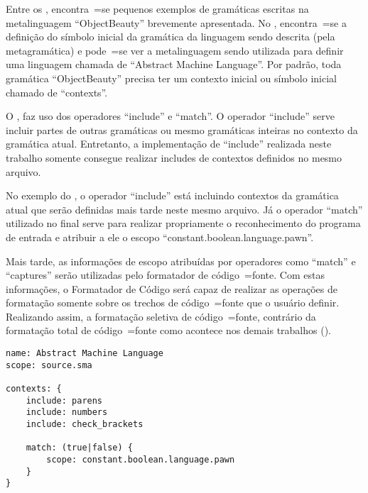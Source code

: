 Entre os ,
encontra~=se pequenos exemplos de gramáticas escritas na metalinguagem ``ObjectBeauty'' brevemente apresentada.
No ,
encontra~=se a definição do símbolo inicial da gramática da linguagem sendo descrita (pela metagramática) e
pode~=se ver a metalinguagem sendo utilizada para definir uma linguagem chamada de ``Abstract Machine Language''.
Por padrão,
toda gramática ``ObjectBeauty'' precisa ter um contexto inicial ou
símbolo inicial chamado de ``contexts''.

O ,
faz uso dos operadores ``include'' e
``match''.
O operador ``include'' serve incluir partes de outras gramáticas ou
mesmo gramáticas inteiras no contexto da gramática atual.
Entretanto,
a implementação de ``include'' realizada neste trabalho somente consegue realizar includes de contextos definidos no mesmo arquivo.

No exemplo do ,
o operador ``include'' está incluindo contextos da gramática atual que serão definidas mais tarde neste mesmo arquivo.
Já o operador ``match'' utilizado no final serve para realizar propriamente o reconhecimento do programa de entrada e
atribuir a ele o escopo ``constant.boolean.language.pawn''.

Mais tarde,
as informações de escopo atribuídas por operadores como ``match'' e
``captures'' serão utilizadas pelo formatador de código~=fonte.
Com estas informações,
o Formatador de Código será capaz de realizar as operações de formatação somente sobre os trechos de código~=fonte que o usuário definir.
Realizando assim,
a formatação seletiva de código~=fonte,
contrário da formatação total de código~=fonte como acontece nos demais trabalhos ().
\begin{lstlisting}[caption={Exemplo de Gramática, Símbolo Inicial},label={exemploDeGramaticaPawn1},style=yaml_style]
name: Abstract Machine Language
scope: source.sma

contexts: {
    include: parens
    include: numbers
    include: check_brackets

    match: (true|false) {
        scope: constant.boolean.language.pawn
    }
}
\end{lstlisting}

